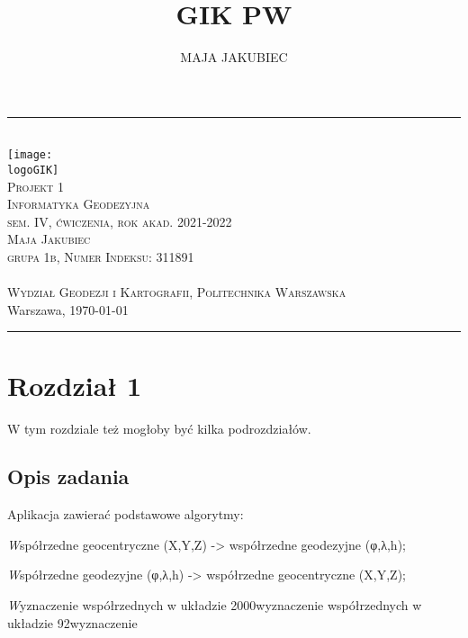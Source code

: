 \documentclass[10pt,a4paper]{article}
\title{GIK PW}
\author{MAJA JAKUBIEC}
\newcommand{\logoGIK}{settings/WGiK-znak.png}
\newcommand{\authorName}{Maja Jakubiec  \\ grupa 1b, Numer Indeksu: 311891}
\newcommand{\titeReport}{Projekt 1} %
\newcommand{\titleLecture}{Informatyka Geodezyjna \\ sem. IV, ćwiczenia, rok akad. 2021-2022} %
\newcommand{\faculty}{Wydział Geodezji i Kartografii}
\newcommand{\university}{Politechnika Warszawska}
\newcommand{\city}{Warszawa}
\begin{document}
\begin{center}
	\rule{\textwidth}{.5pt} \\
	\vspace{1.0cm}
	\texttt{[image: \\logoGIK]}
	\vspace{0.5cm} \\
	\Large \textsc{\titeReport}
	\vspace{0.5cm} \\  
	\large \textsc{\titleLecture}
	\vspace{0.5cm}\\
	\textsc{\authorName}  \\
	\mymail \\
	\textsc{\faculty}, \textsc{\university}  \\ 
	\city, \today
\end{center} 
\rule{\textwidth}{1.5pt}




\tableofcontents 								%

\newpage 
\section{Rozdział 1}
W tym rozdziale też mogłoby być kilka podrozdziałów.


\subsection{Opis zadania}
Aplikacja zawierać podstawowe algorytmy:
	\item \emph Współrzedne geocentryczne (X,Y,Z) -> współrzedne geodezyjne (φ,λ,h);
	\item \emph Współrzedne geodezyjne (φ,λ,h) -> współrzedne geocentryczne (X,Y,Z);
	\item \emph Wyznaczenie współrzednych w układzie 2000wyznaczenie współrzednych w układzie 92wyznaczenie
\end{document}
